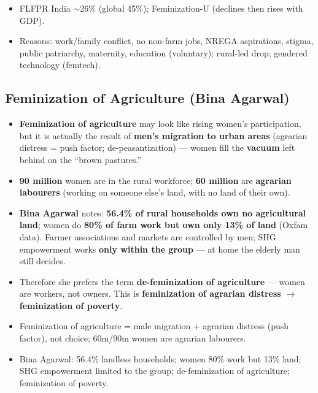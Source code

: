 \begin{QuickRevision}
\begin{itemize}
    \item FLFPR India $\sim$26\% (global 45\%); Feminization-U (declines then rises with GDP).
    \item Reasons: work/family conflict, no non-farm jobs, NREGA aspirations, stigma, public patriarchy, maternity, education (voluntary); rural-led drop; gendered technology (femtech).
\end{itemize}
\end{QuickRevision}

\sectiondivider

\subsection{Feminization of Agriculture (Bina Agarwal)}

\begin{KeyConcept}
\begin{itemize}
    \item \textbf{Feminization of agriculture} may look like rising women's participation, but it is actually the result of \textbf{men's migration to urban areas} (agrarian distress = push factor; de-peasantization) --- women fill the \textbf{vacuum} left behind on the ``brown pastures.''
    \item \textbf{90 million} women are in the rural workforce; \textbf{60 million} are \textbf{agrarian labourers} (working on someone else's land, with no land of their own).
\end{itemize}
\end{KeyConcept}

\begin{DataFact}
\begin{itemize}
    \item \textbf{Bina Agarwal} notes: \textbf{56.4\% of rural households own no agricultural land}; women do \textbf{80\% of farm work but own only 13\% of land} (Oxfam data). Farmer associations and markets are controlled by men; SHG empowerment works \textbf{only within the group} --- at home the elderly man still decides.
    \item Therefore she prefers the term \textbf{de-feminization of agriculture} --- women are workers, not owners. This is \textbf{feminization of agrarian distress} $\rightarrow$ \textbf{feminization of poverty}.
\end{itemize}
\end{DataFact}

\begin{QuickRevision}
\begin{itemize}
    \item Feminization of agriculture = male migration + agrarian distress (push factor), not choice; 60m/90m women are agrarian labourers.
    \item Bina Agarwal: 56.4\% landless households; women 80\% work but 13\% land; SHG empowerment limited to the group; de-feminization of agriculture; feminization of poverty.
\end{itemize}
\end{QuickRevision}
